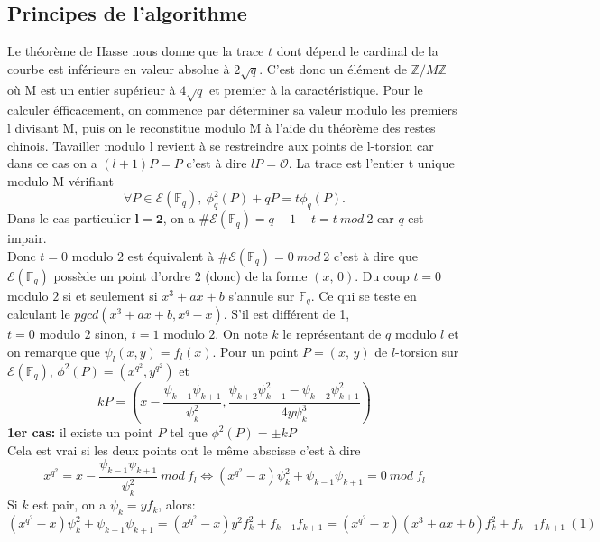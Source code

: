 \documentclass[letterpaper, 12pt]{article}
\newcommand{\Z}{\mathbb{Z}}
\newcommand{\F}{\mathbb{F}_q}
\newcommand{\E}{\mathcal{E}}
\begin{document}
\subsection{Principes de l'algorithme}
Le théorème de Hasse nous donne que la trace $t$ dont dépend le cardinal de la courbe est inférieure en valeur absolue à $ 2 \sqrt{q} $. C'est donc un élément de $ \Z/M \Z $ où M est un entier supérieur à $ 4 \sqrt{q} $ et premier à la caractéristique.
\newline
\newline
Pour le calculer éfficacement, on commence par déterminer sa valeur modulo les premiers l divisant M, puis on le reconstitue modulo M à l'aide du théorème des restes chinois. Tavailler modulo l revient à se restreindre aux points de l-torsion car dans ce cas on a $ (l+1)P = P $ c'est à dire $ lP = \mathcal{O} $.
\newline
\newline
La trace est l'entier t unique modulo M vérifiant
$$ \forall P \in \E(\F),\ \phi_q^{2}(P)+qP = t \phi_q(P). $$
\newline
\newline
Dans le cas particulier $ \mathbf{l=2} $, on a $ \#\E(\F) = q+1-t = t\ mod\ 2 $ car $q$ est impair.\\ Donc $t=0$ modulo $2$ est équivalent à $ \#\E(\F) = 0\ mod\ 2 $ c'est à dire que $\E(\F)$ possède un point d'ordre $2$ (donc) de la forme $(x,\,0)$.
Du coup $t=0$ modulo $2$ si et seulement si $ x^3+ax+b $ s'annule sur $\F$.
Ce qui se teste en calculant le $ pgcd(x^3+ax+b,x^{q}-x) $. S'il est différent de 1,\\
$t=0$ modulo $2$ sinon, $t=1$ modulo $2$.
\newline
\newline
On note $k$ le représentant de $q$ modulo $l$ et on remarque que $\psi_{l}(x,y)=f_{l}(x)$. Pour un point $P=(x,\,y)$ de $l$-torsion sur $\E(\F)$, $\phi^2(P)=(x^{q^2},y^{q^2})$ et $$kP=\left(x-\frac{\psi_{k-1}\psi_{k+1}}{\psi_{k}^2},\frac{\psi_{k+2}\psi_{k-1}^2-\psi_{k-2}\psi_{k+1}^2}{4y\psi_{k}^3}\right)$$
\newline
\textbf{1er cas:} il existe un point $P$ tel que $\phi^2(P)= \pm kP$\\
Cela est vrai si les deux points ont le même abscisse c'est à dire
$$ x^{q^2} = x-\frac{\psi_{k-1}\psi_{k+1}}{\psi_{k}^2}\ mod\ f_{l} \Leftrightarrow (x^{q^2}-x)\psi_{k}^2+\psi_{k-1}\psi_{k+1} = 0\ mod\ f_{l} $$
Si $k$ est pair, on a $\psi_{k}=yf_{k}$, alors:
$$ (x^{q^2}-x)\psi_{k}^2+\psi_{k-1}\psi_{k+1} = (x^{q^2}-x)y^2f_{k}^2+f_{k-1}f_{k+1} = (x^{q^2}-x)(x^3+ax+b)f_{k}^2+f_{k-1}f_{k+1}\ (1) $$
\end{document}

